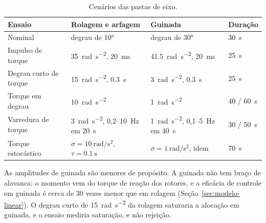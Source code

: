 \begin{table}[htbp]
\centering
\caption{Cenários das pastas de eixo.}
\label{tab:cenarios}
\small
\begin{tabular}{llll}
\toprule
Ensaio & Rolagem e arfagem & Guinada & Duração \\
\midrule
Nominal                & degrau de \ang{10}             & degrau de \ang{30}            & \SI{30}{\second} \\
Impulso de torque      & \SI{35}{\radian\per\second\squared}, \SI{20}{\milli\second} & \SI{41.5}{\radian\per\second\squared}, \SI{20}{\milli\second} & \SI{25}{\second} \\
Degrau curto de torque & \SI{15}{\radian\per\second\squared}, \SI{0.3}{\second} & \SI{3}{\radian\per\second\squared}, \SI{0.3}{\second} & \SI{25}{\second} \\
Torque em degrau       & \SI{10}{\radian\per\second\squared} & \SI{1}{\radian\per\second\squared} & 40 / \SI{60}{\second} \\
Varredura de torque    & \SI{3}{\radian\per\second\squared}, 0,2--\SI{10}{\hertz} em \SI{20}{\second} & \SI{1}{\radian\per\second\squared}, 0,1--\SI{5}{\hertz} em \SI{40}{\second} & 30 / \SI{50}{\second} \\
Torque estocástico     & $\sigma = \SI{10}{\radian\per\second\squared}$, $\tau = \SI{0.1}{\second}$ & $\sigma = \SI{1}{\radian\per\second\squared}$, idem & \SI{70}{\second} \\
\bottomrule
\end{tabular}

\end{table}

As amplitudes de guinada são menores de propósito. A guinada não tem braço de
alavanca: o momento vem do torque de reação dos rotores, e a eficácia de
controle em guinada é cerca de 30 vezes menor que em rolagem
(Seção~\ref{sec:modelo-linear}). O degrau curto de
\SI{15}{\radian\per\second\squared} da rolagem saturaria a alocação em
guinada, e o ensaio mediria saturação, e não rejeição.

